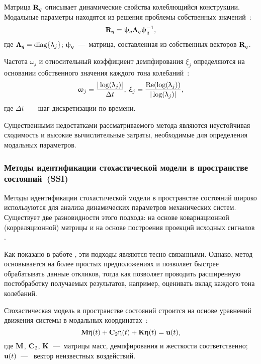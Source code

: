 Матрица $ \mathbf{R}_q $ описывает динамические свойства колеблющийся конструкции. Модальные параметры находятся из решения проблемы собственных значений~\cite{lib:oma:Maia}:
\begin{equation}
	\mathbf{R}_q = \uppsi_q \mathbf{\Lambda}_q \uppsi_q^{-1},
\end{equation}
где $ \mathbf{\Lambda}_q = \operatorname{diag} \{ \uplambda_j \} $; $ \mathbf{\uppsi}_q $~---~матрица, составленная из собственных векторов $ \mathbf{R}_q $.

Частота $ \omega_j $ и относительный коэффициент демпфирования $ \xi_j $ определяются на основании собственного значения каждого тона колебаний~\cite{lib:oma:Nafid}:
\begin{equation}
	\begin{gathered}
		\upomega_j = \frac{|\log(\uplambda_j)|}{\Delta t}, \:
		\upxi_j = \frac{\operatorname{Re}(\log(\uplambda_j))}{|\log(\uplambda_j)|},
	\end{gathered}
\end{equation}
где $ \Delta t $~---~шаг дискретизации по времени.

Существенными недостатками рассматриваемого метода являются неустойчивая сходимость и высокие вычислительные затраты, необходимые для определения модальных параметров.

\subsubsection{Методы идентификации стохастической модели в пространстве состояний~(SSI)}

Методы идентификации стохастической модели в пространстве состояний широко используются для анализа динамических параметров механических систем. Существует две разновидности этого подхода: на основе ковариационной (корреляционной) матрицы  и на основе построения проекций исходных сигналов  \cite{lib:oma:Rainieri}. 

Как показано в работе \cite{lib:oma:Peeters}, эти подходы являются тесно связанными. Однако, метод  основывается на более простых предположениях и позволяет быстрее обрабатывать данные откликов, тогда как  позволяет проводить расширенную постобработку получаемых результатов, например, оценивать вклад каждого тона колебаний.

Стохастическая модель в пространстве состояний строится на основе уравнений движения системы в модальных координатах~\cite{lib:oma:Reynders}:
\begin{equation}
	\mathbf{M} \ddot{\mathbf{\upeta}}(t) + \mathbf{C}_2 \dot{\mathbf{\upeta}}(t) + \mathbf{K} \upeta(t) = \mathbf{u}(t),
\end{equation}
где $ \mathbf{M} $, $ \mathbf{C}_2 $, $ \mathbf{K} $~---~матрицы масс, демпфирования и жесткости соответственно; $ \mathbf{u}(t) $~---~ вектор неизвестных воздействий. 


